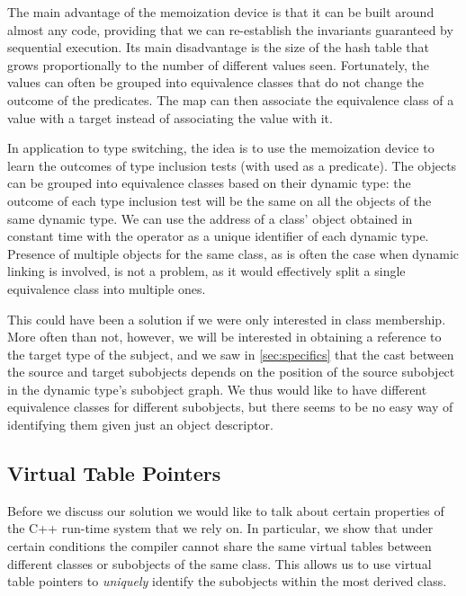 The main advantage of the memoization device is that it can be built around 
almost any code, providing that we can re-establish the invariants guaranteed 
by sequential execution. Its main disadvantage is the size of the hash table 
that grows proportionally to the number of different values seen. Fortunately, 
the values can often be grouped into equivalence classes that do not change the 
outcome of the predicates. The map can then associate the equivalence class of a 
value with a target instead of associating the value with it. 

In application to type switching, the idea is to use the memoization device to 
learn the outcomes of type inclusion tests (with  used as a 
predicate). The objects can be grouped into equivalence classes based on their 
dynamic type: the outcome of each type inclusion test will be the same on 
all the objects of the same dynamic type. We can use the  
address of a class'  object obtained in constant time with the
 operator as a unique identifier of each dynamic type. 
Presence of multiple  objects for the same class, as is often 
the case when dynamic linking is involved, is not a problem, as it would 
effectively split a single equivalence class into multiple ones. 

This could have been a solution if we were only interested in class membership. 
More often than not, however, we will be interested in obtaining a reference to 
the target type of the subject, and we saw in \textsection\ref{sec:specifics} 
that the cast between the source and target subobjects depends on 
the position of the source subobject in the dynamic type's subobject graph. 
We thus would like to have different equivalence classes for different 
subobjects, but there seems to be no easy way of identifying them given just an object descriptor.

\subsection{Virtual Table Pointers}
\label{sec:vtp}


Before we discuss our solution we would like to talk about certain properties of 
the C++ run-time system that we rely on. In particular,
we show that under certain conditions the compiler cannot share 
the same virtual tables between different classes or subobjects of the same 
class. This allows us to use virtual table pointers to \emph{uniquely} identify 
the subobjects within the most derived class.

